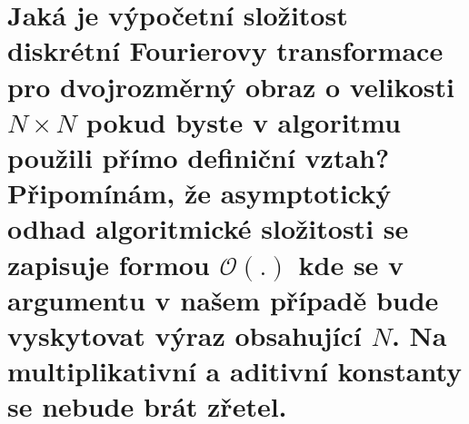 \section{Jaká je výpočetní složitost diskrétní Fourierovy transformace pro dvojrozměrný obraz o velikosti $N \times N$ 
pokud byste v algoritmu použili přímo definiční vztah? Připomínám, že asymptotický odhad algoritmické složitosti se 
zapisuje formou $\mathcal{O}(.)$ kde se v argumentu v našem případě bude vyskytovat výraz obsahující $N$. Na 
multiplikativní a aditivní konstanty se nebude brát zřetel.}